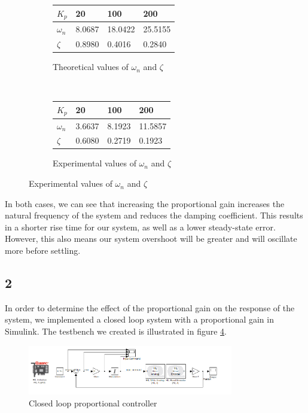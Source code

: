 \documentclass{article}
\begin{document}
\begin{figure}[!htb]
    \centering
    \begin{subfigure}[b]{0.4\textwidth}
        \begin{tabular}{|l|l|l|l|}
            \hline
            $K_p$ & 20 & 100 & 200 \\\hline
            $\omega_n$ & 8.0687 & 18.0422 & 25.5155\\\hline
            $\zeta$ &  0.8980 & 0.4016 & 0.2840\\\hline
        \end{tabular}
        \caption{Theoretical values of $\omega_n$ and $\zeta$}
        \label{fig:theo2}
    \end{subfigure}
    ~ \begin{subfigure}[b]{0.4\textwidth}
        \begin{tabular}{|l|l|l|l|}
            \hline
            $K_p$ & 20 & 100 & 200 \\\hline
            $\omega_n$ & 3.6637 & 8.1923 & 11.5857\\\hline
            $\zeta$ & 0.6080 & 0.2719 & 0.1923\\\hline
        \end{tabular}
        \caption{Experimental values of $\omega_n$ and $\zeta$}
        \label{fig:exp2}
    \end{subfigure}
\end{figure}

In both cases, we can see that increasing the proportional gain increases the natural frequency of the system and reduces the damping coefficient. This results in a shorter rise time for our system, as well as a lower steady-state error. However, this also means our system overshoot will be greater and will oscillate more before settling.

\subsection*{2}
In order to determine the effect of the proportional gain on the response of the system, we implemented a closed loop system with a proportional gain in Simulink. The testbench we created is illustrated in figure \ref{fig:test2}.

\begin{figure}[!htb]
    \centering
    \includegraphics[width=0.8\textwidth]{part2_schematic.PNG}
    \caption{Closed loop proportional controller}
    \label{fig:test2}
\end{figure}
\end{document}

